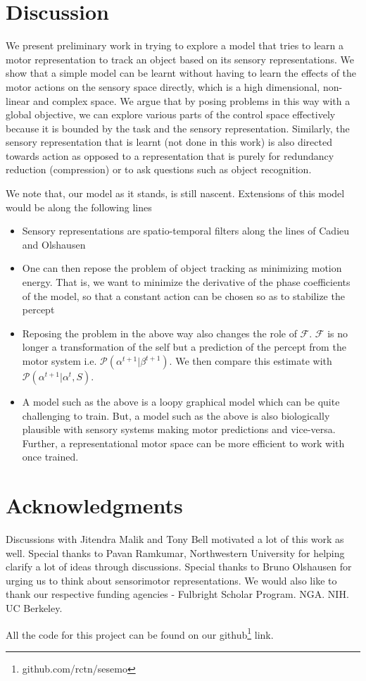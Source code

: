\documentclass[conference]{IEEEtran}
\begin{document}
\section{Discussion}

We present preliminary work in trying to explore a model that tries to learn a motor representation to track an object based on its sensory representations. We show that a simple model can be learnt without having to learn the effects of the motor actions on the sensory space directly, which is a high dimensional, non-linear and complex space. We argue that by posing problems in this way with a global objective, we can explore various parts of the control space effectively because it is bounded by the task and the sensory representation. Similarly, the sensory representation that is learnt (not done in this work) is also directed towards action as opposed to a representation that is purely for redundancy reduction (compression) or to ask questions such as object recognition.

We note that, our model as it stands, is still nascent. Extensions of this model would be along the following lines
\begin{itemize}
\item Sensory representations are spatio-temporal filters along the lines of Cadieu and Olshausen \cite{cadieu2012learning}
\item One can then repose the problem of object tracking as minimizing motion energy. That is, we want to minimize the derivative of the phase coefficients of the model, so that a constant action can be chosen so as to stabilize the percept
\item Reposing the problem in the above way also changes the role of $\mathcal{F}$.  $\mathcal{F}$ is no longer a transformation of the self but a prediction of the percept from the motor system i.e. $\mathcal{P}(\alpha^{t+1} | \beta^{t+1})$. We then compare this estimate with $\mathcal{P}(\alpha^{t+1} | \alpha^{t}, S)$.
\item A model such as the above is a loopy graphical model which can be quite challenging to train. But, a model such as the above is also biologically plausible with sensory systems making motor predictions and vice-versa. Further, a representational motor space can be more efficient to work with once trained.
\end{itemize}

\section{ Acknowledgments} 

Discussions with Jitendra Malik and Tony Bell motivated a lot of this work as well. Special thanks to Pavan Ramkumar, Northwestern University for helping clarify a lot of ideas through discussions. Special thanks to Bruno Olshausen for urging us to think about sensorimotor representations. We would also like to thank our respective funding agencies - Fulbright Scholar Program. NGA. NIH. UC Berkeley.

All the code for this project can be found on our github\footnote{github.com/rctn/sesemo} link.




\end{document}
